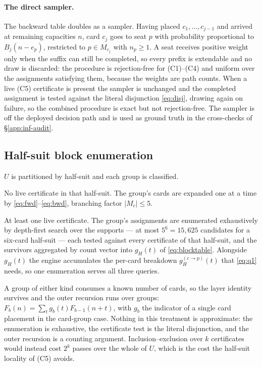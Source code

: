 \paragraph{The direct sampler.} The backward table doubles as a sampler. Having
placed $c_1,\dots,c_{j-1}$ and arrived at remaining capacities $n$, card $c_j$
goes to seat $p$ with probability proportional to $B_j(n - e_p)$, restricted to
$p \in M_{c_j}$ with $n_p \ge 1$. A seat receives positive weight only when the
suffix can still be completed, so every prefix is extendable and no draw is
discarded: the procedure is rejection-free for (C1)--(C4) and uniform over the
assignments satisfying them, because the weights are path counts. When a live
(C5) certificate is present the sampler is unchanged and the completed assignment
is tested against the literal disjunction \eqref{eq:disj}, drawing again on
failure, so the combined procedure is exact but not rejection-free. The sampler
is off the deployed decision path and is used as ground truth in the
cross-checks of \S\ref{app:inf-audit}.

\subsection{Half-suit block enumeration}
\label{app:inf-blocks}

$U$ is partitioned by half-suit and each group is classified.

\begin{description}[style=nextline]
  \item[Card group.] No live certificate in that half-suit. The group's cards are
        expanded one at a time by \eqref{eq:fwd}--\eqref{eq:bwd}, branching factor
        $|M_c| \le 5$.
  \item[Block group.] At least one live certificate. The group's assignments are
        enumerated exhaustively by depth-first search over the supports --- at
        most $5^6 = 15{,}625$ candidates for a six-card half-suit --- each tested
        against every certificate of that half-suit, and the survivors aggregated
        by count vector into $g_H(t)$ of \eqref{eq:blocktable}. Alongside
        $g_H(t)$ the engine accumulates the per-card breakdown
        $g_H^{(c\to p)}(t)$ that \eqref{eq:q1} needs, so one enumeration serves
        all three queries.
\end{description}

A group of either kind consumes a known number of cards, so the layer identity
survives and the outer recursion runs over groups: $F_b(n) = \sum_t g_b(t)
F_{b-1}(n+t)$, with $g_b$ the indicator of a single card placement in the
card-group case. Nothing in this treatment is approximate: the enumeration is
exhaustive, the certificate test is the literal disjunction, and the outer
recursion is a counting argument. Inclusion--exclusion over $k$ certificates
would instead cost $2^k$ passes over the whole of $U$, which is the cost the
half-suit locality of (C5) avoids.


